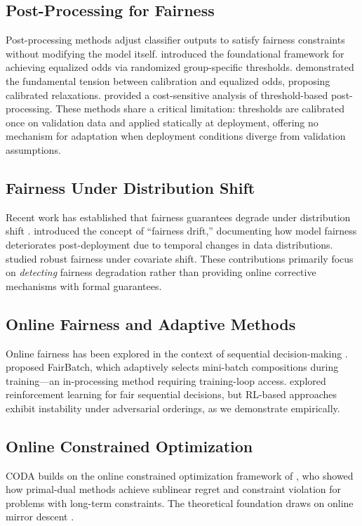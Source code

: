 \documentclass[letterpaper]{article} %
\theoremstyle{definition}
\begin{document}
\subsection{Post-Processing for Fairness}
Post-processing methods adjust classifier outputs to satisfy fairness constraints without modifying the model itself. \citet{hardt2016equality} introduced the foundational framework for achieving equalized odds via randomized group-specific thresholds. \citet{pleiss2017fairness} demonstrated the fundamental tension between calibration and equalized odds, proposing calibrated relaxations. \citet{menon2018cost} provided a cost-sensitive analysis of threshold-based post-processing. These methods share a critical limitation: thresholds are calibrated once on validation data and applied statically at deployment, offering no mechanism for adaptation when deployment conditions diverge from validation assumptions.

\subsection{Fairness Under Distribution Shift}
Recent work has established that fairness guarantees degrade under distribution shift \cite{singh2024fairness}. \citet{chen2025fairnessdrift} introduced the concept of ``fairness drift,'' documenting how model fairness deteriorates post-deployment due to temporal changes in data distributions. \citet{rezaei2021robust} studied robust fairness under covariate shift. These contributions primarily focus on \emph{detecting} fairness degradation rather than providing online corrective mechanisms with formal guarantees.

\subsection{Online Fairness and Adaptive Methods}
Online fairness has been explored in the context of sequential decision-making \cite{gillen2018online,blum2018preserving}. \citet{roh2021fairbatch} proposed FairBatch, which adaptively selects mini-batch compositions during training---an in-processing method requiring training-loop access. \citet{zhang2020fairness} explored reinforcement learning for fair sequential decisions, but RL-based approaches exhibit instability under adversarial orderings, as we demonstrate empirically.

\subsection{Online Constrained Optimization}
CODA builds on the online constrained optimization framework of \citet{mahdavi2012trading}, who showed how primal-dual methods achieve sublinear regret and constraint violation for problems with long-term constraints. The theoretical foundation draws on online mirror descent \cite{hazan2016introduction,shalev2012online}.
\end{document}
